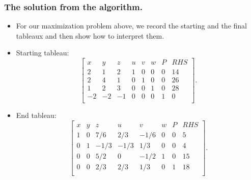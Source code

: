 


\begin{frame}%
  \frametitle{The solution from the algorithm.}
  \begin{itemize}%
 
\item
For our maximization problem above, we record the starting and the final
tableaux and then show how to interpret them.

\item Starting tableau:
$$\left[
\begin{array}{rrrrrrr|r}
x & y & z & u & v & w & P & RHS\\\hline
2 & 1 & 2 & 1 & 0 & 0 & 0 & 14\\
2 & 4 & 1 & 0 & 1 & 0 & 0 & 26\\
1 & 2 & 3 & 0 & 0 & 1 & 0 & 28\\\hline
-2 & -2 & -1 & 0 & 0 & 0 & 1 & 0 \\
\end{array}
\right].
$$

\item End tableau:
$$\left[
\begin{array}{rrrrrrr|r}
x & y & z & u & v & w & P & RHS\\\hline
1 & 0 & 7/6 & 2/3 & -1/6 & 0 & 0 & 5\\
0 & 1 & -1/3  & -1/3 & 1/3 & 0 & 0 & 4\\
0 & 0 & 5/2 & 0 & -1/2 & 1 & 0 & 15\\\hline
0 & 0 & 2/3 & 2/3 & 1/3 & 0 & 1 & 18 \\
\end{array}
\right].
$$

\end{itemize}
\end{frame}


